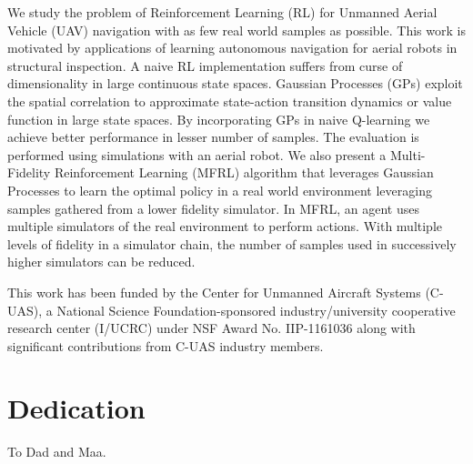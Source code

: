 \documentclass[12pt]{report}
\begin{document}
We study the problem of Reinforcement Learning (RL) for Unmanned Aerial Vehicle (UAV) navigation with as few real world samples as possible. This work is motivated by applications of learning autonomous navigation for aerial robots in structural inspection. A naive RL implementation suffers from curse of dimensionality in large continuous state spaces. Gaussian Processes (GPs) exploit the spatial correlation to approximate state-action transition dynamics or value function in large state spaces. By incorporating GPs in naive Q-learning we achieve better performance in lesser number of samples. The evaluation is performed using simulations with an aerial robot. We also present a Multi-Fidelity Reinforcement Learning (MFRL) algorithm that leverages Gaussian Processes to learn the optimal policy in a real world environment leveraging samples gathered from a lower fidelity simulator. In MFRL, an agent uses multiple simulators of the real environment to perform actions. With multiple levels of fidelity in a simulator chain, the number of samples used in successively higher simulators can be reduced.

\vfill


This work has been funded by the Center for Unmanned Aircraft Systems (C-UAS), a National Science Foundation-sponsored industry/university cooperative research center (I/UCRC) under NSF Award No. IIP-1161036 along with significant contributions from C-UAS industry members.

\pagebreak

\chapter*{Dedication}
To Dad and Maa. 
\end{document}
